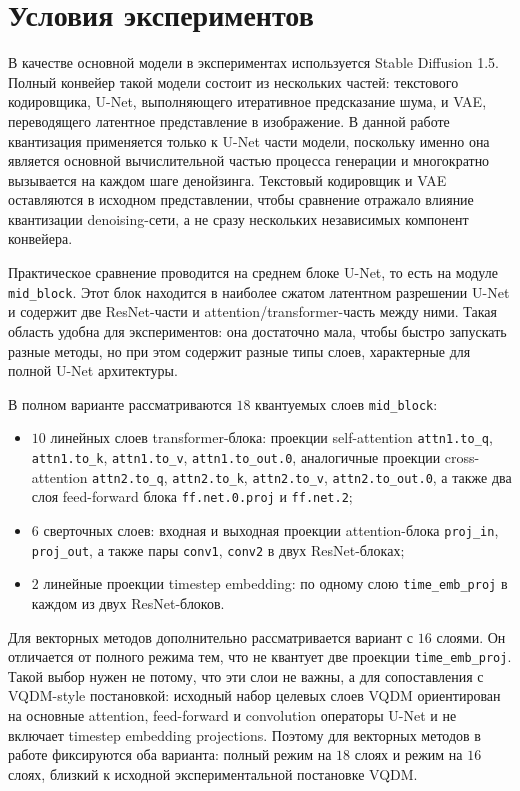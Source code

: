 \documentclass[a4paper,12pt]{article}
\begin{document}
\section{Условия экспериментов}

В качестве основной модели в экспериментах используется Stable Diffusion 1.5. Полный конвейер такой модели состоит из нескольких частей: текстового кодировщика, U-Net, выполняющего итеративное предсказание шума, и VAE, переводящего латентное представление в изображение. В данной работе квантизация применяется только к U-Net части модели, поскольку именно она является основной вычислительной частью процесса генерации и многократно вызывается на каждом шаге денойзинга. Текстовый кодировщик и VAE оставляются в исходном представлении, чтобы сравнение отражало влияние квантизации denoising-сети, а не сразу нескольких независимых компонент конвейера.

Практическое сравнение проводится на среднем блоке U-Net, то есть на модуле \texttt{mid\_block}. Этот блок находится в наиболее сжатом латентном разрешении U-Net и содержит две ResNet-части и attention/transformer-часть между ними. Такая область удобна для экспериментов: она достаточно мала, чтобы быстро запускать разные методы, но при этом содержит разные типы слоев, характерные для полной U-Net архитектуры.

В полном варианте рассматриваются $18$ квантуемых слоев \texttt{mid\_block}:
\begin{itemize}
    \item $10$ линейных слоев transformer-блока: проекции self-attention \texttt{attn1.to\_q}, \texttt{attn1.to\_k}, \texttt{attn1.to\_v}, \texttt{attn1.to\_out.0}, аналогичные проекции cross-attention \texttt{attn2.to\_q}, \texttt{attn2.to\_k}, \texttt{attn2.to\_v}, \texttt{attn2.to\_out.0}, а также два слоя feed-forward блока \texttt{ff.net.0.proj} и \texttt{ff.net.2};
    \item $6$ сверточных слоев: входная и выходная проекции attention-блока \texttt{proj\_in}, \texttt{proj\_out}, а также пары \texttt{conv1}, \texttt{conv2} в двух ResNet-блоках;
    \item $2$ линейные проекции timestep embedding: по одному слою \texttt{time\_emb\_proj} в каждом из двух ResNet-блоков.
\end{itemize}

Для векторных методов дополнительно рассматривается вариант с $16$ слоями. Он отличается от полного режима тем, что не квантует две проекции \texttt{time\_emb\_proj}. Такой выбор нужен не потому, что эти слои не важны, а для сопоставления с VQDM-style постановкой: исходный набор целевых слоев VQDM ориентирован на основные attention, feed-forward и convolution операторы U-Net и не включает timestep embedding projections. Поэтому для векторных методов в работе фиксируются оба варианта: полный режим на $18$ слоях и режим на $16$ слоях, близкий к исходной экспериментальной постановке VQDM.
\end{document}
